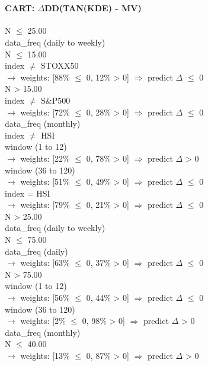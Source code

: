 \
\paragraph{CART: $\Delta$DD(TAN(KDE) - MV)}

\begin{flushleft}
\ttfamily %
N $\leq$ 25.00 \\
\quad data\_freq (daily to weekly) \\
\quad \quad N $\leq$ 15.00 \\
\quad \quad \quad index $\neq$ STOXX50 \\
\quad \quad \quad \quad $\rightarrow$ weights: [88\% $\leq$ 0, 12\% > 0] $\Rightarrow$ predict $\Delta$ $\leq$ 0 \\
\quad \quad N > 15.00 \\
\quad \quad \quad index $\neq$ S\&P500 \\
\quad \quad \quad \quad $\rightarrow$ weights: [72\% $\leq$ 0, 28\% > 0] $\Rightarrow$ predict $\Delta$ $\leq$ 0 \\
\quad data\_freq (monthly) \\
\quad \quad index $\neq$ HSI \\
\quad \quad \quad window (1 to 12) \\
\quad \quad \quad \quad $\rightarrow$ weights: [22\% $\leq$ 0, 78\% > 0] $\Rightarrow$ predict $\Delta$ > 0 \\
\quad \quad \quad window (36 to 120) \\
\quad \quad \quad \quad $\rightarrow$ weights: [51\% $\leq$ 0, 49\% > 0] $\Rightarrow$ predict $\Delta$ $\leq$ 0 \\
\quad \quad index = HSI \\
\quad \quad \quad \quad $\rightarrow$ weights: [79\% $\leq$ 0, 21\% > 0] $\Rightarrow$ predict $\Delta$ $\leq$ 0 \\
N > 25.00 \\
\quad data\_freq (daily to weekly) \\
\quad \quad N $\leq$ 75.00 \\
\quad \quad \quad data\_freq (daily) \\
\quad \quad \quad \quad $\rightarrow$ weights: [63\% $\leq$ 0, 37\% > 0] $\Rightarrow$ predict $\Delta$ $\leq$ 0 \\
\quad \quad N > 75.00 \\
\quad \quad \quad window (1 to 12) \\
\quad \quad \quad \quad $\rightarrow$ weights: [56\% $\leq$ 0, 44\% > 0] $\Rightarrow$ predict $\Delta$ $\leq$ 0 \\
\quad \quad \quad window (36 to 120) \\
\quad \quad \quad \quad $\rightarrow$ weights: [2\% $\leq$ 0, 98\% > 0] $\Rightarrow$ predict $\Delta$ > 0 \\
\quad data\_freq (monthly) \\
\quad \quad N $\leq$ 40.00 \\
\quad \quad \quad \quad $\rightarrow$ weights: [13\% $\leq$ 0, 87\% > 0] $\Rightarrow$ predict $\Delta$ > 0 \\
\end{flushleft}
